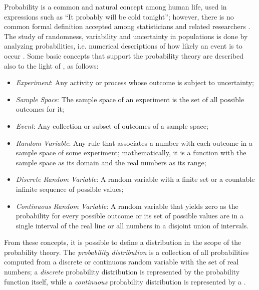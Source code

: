Probability is a common and natural concept among human life, used in expressions such as ``It probably will be cold tonight''; however, there is no common formal definition accepted among statisticians and related researchers \cite{degroot2012probability}. The study of randomness, variability and uncertainty in populations is done by analyzing probabilities, i.e. numerical descriptions of how likely an event is to occur \cite{devore2011probability}. Some basic concepts that support the probability theory are described also to the light of , as follows:

\begin{itemize}
    \item \emph{Experiment}: Any activity or process whose outcome is subject to uncertainty;
    
    \item \emph{Sample Space}: The sample space of an experiment is the set of all possible outcomes for it;
    
    \item \emph{Event}: Any collection or subset of outcomes of a sample space;
    
    \item \emph{Random Variable}: Any rule that associates a number with each outcome in a sample space of some experiment; mathematically, it is a function with the sample space as its domain and the real numbers as its range;
    
    \item \emph{Discrete Random Variable}: A random variable with a finite set or a countable infinite sequence of possible values;
    
    \item \emph{Continuous Random Variable}: A random variable that yields zero as the probability for every possible outcome or its set of possible values are in a single interval of the real line or all numbers in a disjoint union of intervals.
    
\end{itemize}

From these concepts, it is possible to define a distribution in the scope of the probability theory. The \emph{probability distribution} is a collection of all probabilities computed from a  discrete or continuous random variable with the set of real numbers; a \emph{discrete} probability distribution is represented by the probability function itself, while a \emph{continuous} probability distribution is represented by a  \cite{mendenhall2016statistics}.

